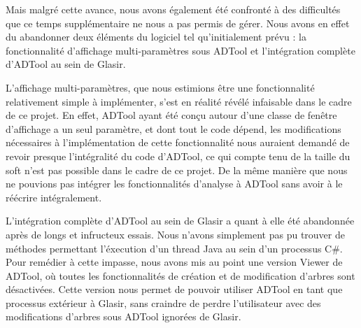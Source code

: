Mais malgré cette avance, nous avons également été confronté à des difficultés que ce temps supplémentaire ne nous a pas permis de gérer. Nous avons en effet du abandonner deux éléments du logiciel tel qu'initialement prévu : la fonctionnalité d'affichage multi-paramètres sous ADTool et l'intégration complète d'ADTool au sein de Glasir.

L'affichage multi-paramètres, que nous estimions être une fonctionnalité relativement simple à implémenter, s'est en réalité révélé infaisable dans le cadre de ce projet. En effet, ADTool ayant été conçu autour d'une classe de fenêtre d'affichage a un seul paramètre, et dont tout le code dépend, les modifications nécessaires à l'implémentation de cette fonctionnalité nous auraient demandé de revoir presque l'intégralité du code d'ADTool, ce qui compte tenu de la taille du soft n'est pas possible dans le cadre de ce projet. De la même manière que nous ne pouvions pas intégrer les fonctionnalités d'analyse à ADTool sans avoir à le réécrire intégralement.

L'intégration complète d'ADTool au sein de Glasir a quant à elle été abandonnée après de longs et infructeux essais. Nous n'avons simplement pas pu trouver de méthodes permettant l'éxecution d'un thread Java au sein d'un processus C\#. Pour remédier à cette impasse, nous avons mis au point une version \og Viewer \fg de ADTool, où toutes les fonctionnalités de création et de modification d'arbres sont désactivées. Cette version nous permet de pouvoir utiliser ADTool en tant que processus extérieur à Glasir, sans craindre de perdre l'utilisateur avec des modifications d'arbres sous ADTool ignorées de Glasir.  

